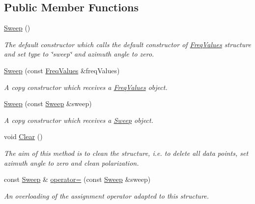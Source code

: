 \subsection*{Public Member Functions}
\begin{DoxyCompactItemize}
\item 
\mbox{\label{structSweep_a154d8154b44ffd83c26375ca8d688591}} 
\hyperlink{structSweep_a154d8154b44ffd83c26375ca8d688591}{Sweep} ()
\begin{DoxyCompactList}\small\item\em The default constructor which calls the default constructor of {\itshape \hyperlink{structFreqValues}{Freq\+Values}} structure and set type to \char`\"{}sweep\char`\"{} and azimuth angle to zero. \end{DoxyCompactList}\item 
\mbox{\label{structSweep_ae85ac9f2a48f93e3fc510118c7d67f7f}} 
\hyperlink{structSweep_ae85ac9f2a48f93e3fc510118c7d67f7f}{Sweep} (const \hyperlink{structFreqValues}{Freq\+Values} \&freq\+Values)
\begin{DoxyCompactList}\small\item\em A copy constructor which receives a {\itshape \hyperlink{structFreqValues}{Freq\+Values}} object. \end{DoxyCompactList}\item 
\mbox{\label{structSweep_a0a4e0f72fe9051d35cb29953005463b3}} 
\hyperlink{structSweep_a0a4e0f72fe9051d35cb29953005463b3}{Sweep} (const \hyperlink{structSweep}{Sweep} \&sweep)
\begin{DoxyCompactList}\small\item\em A copy constructor which receives a {\itshape \hyperlink{structSweep}{Sweep}} object. \end{DoxyCompactList}\item 
\mbox{\label{structSweep_aa852ab0cf53dc52ec354649cf6cec31e}} 
void \hyperlink{structSweep_aa852ab0cf53dc52ec354649cf6cec31e}{Clear} ()
\begin{DoxyCompactList}\small\item\em The aim of this method is to clean the structure, i.\+e. to delete all data points, set azimuth angle to zero and clean polarization. \end{DoxyCompactList}\item 
\mbox{\label{structSweep_ae20eba1adf7d9510a2433ce942b14007}} 
const \hyperlink{structSweep}{Sweep} \& \hyperlink{structSweep_ae20eba1adf7d9510a2433ce942b14007}{operator=} (const \hyperlink{structSweep}{Sweep} \&sweep)
\begin{DoxyCompactList}\small\item\em An overloading of the assignment operator adapted to this structure. \end{DoxyCompactList}\end{DoxyCompactItemize}
